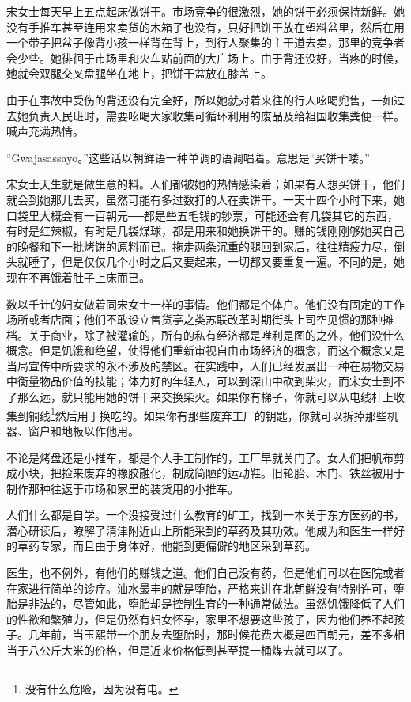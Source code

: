 宋女士每天早上五点起床做饼干。市场竞争的很激烈，她的饼干必须保持新鲜。她没有手推车甚至连用来卖货的木箱子也没有，只好把饼干放在塑料盆里，然后在用一个带子把盆子像背小孩一样背在背上，到行人聚集的主干道去卖，那里的竞争者会少些。她徘徊于市场里和火车站前面的大广场上。由于背还没好，当疼的时候，她就会双腿交叉盘腿坐在地上，把饼干盆放在膝盖上。

由于在事故中受伤的背还没有完全好，所以她就对着来往的行人吆喝兜售，一如过去她负责人民班时，需要吆喝大家收集可循环利用的废品及给祖国收集粪便一样。喊声充满热情。

“Gwajasassayo。”这些话以朝鲜语一种单调的语调唱着。意思是“买饼干喽。”

宋女士天生就是做生意的料。人们都被她的热情感染着；如果有人想买饼干，他们就会到她那儿去买，虽然可能有多过数打的人在卖饼干。一天十四个小时下来，她口袋里大概会有一百朝元──都是些五毛钱的钞票，可能还会有几袋其它的东西，有时是红辣椒，有时是几袋煤球，都是用来和她换饼干的。赚的钱刚刚够她买自己的晚餐和下一批烤饼的原料而已。拖走两条沉重的腿回到家后，往往精疲力尽，倒头就睡了，但是仅仅几个小时之后又要起来，一切都又要重复一遍。不同的是，她现在不再饿着肚子上床而已。

数以千计的妇女做着同宋女士一样的事情。他们都是个体户。他们没有固定的工作场所或者店面；他们不敢设立售货亭之类苏联改革时期街头上司空见惯的那种摊档。关于商业，除了被灌输的，所有的私有经济都是唯利是图的之外，他们没什么概念。但是饥饿和绝望，使得他们重新审视自由市场经济的概念，而这个概念又是当局宣传中所要求的永不涉及的禁区。在实践中，人们已经发展出一种在易物交易中衡量物品价值的技能；体力好的年轻人，可以到深山中砍到柴火，而宋女士到不了那么远，就只能用她的饼干来交换柴火。如果你有梯子，你就可以从电线杆上收集到铜线\footnote{没有什么危险，因为没有电。}然后用于换吃的。如果你有那些废弃工厂的钥匙，你就可以拆掉那些机器、窗户和地板以作他用。

不论是烤盘还是小推车，都是个人手工制作的，工厂早就关门了。女人们把帆布剪成小块，把捡来废弃的橡胶融化，制成简陋的运动鞋。旧轮胎、木门、铁丝被用于制作那种往返于市场和家里的装货用的小推车。

人们什么都是自学。一个没接受过什么教育的矿工，找到一本关于东方医药的书，潜心研读后，瞭解了清津附近山上所能采到的草药及其功效。他成为和医生一样好的草药专家，而且由于身体好，他能到更偏僻的地区采到草药。

医生，也不例外，有他们的赚钱之道。他们自己没有药，但是他们可以在医院或者在家进行简单的诊疗。油水最丰的就是堕胎，严格来讲在北朝鲜没有特别许可，堕胎是非法的，尽管如此，堕胎却是控制生育的一种通常做法。虽然饥饿降低了人们的性欲和繁殖力，但是仍然有妇女怀孕，家里不想要这些孩子，因为他们养不起孩子。几年前，当玉熙带一个朋友去堕胎时，那时候花费大概是四百朝元，差不多相当于八公斤大米的价格，但是近来价格低到甚至提一桶煤去就可以了。

